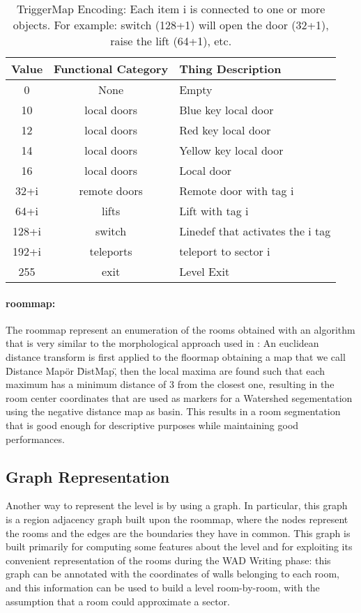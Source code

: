 \begin{table}
\begin{tabularx}{\textwidth}{| c | c | X | }
	\hline
	\textbf{Value} & \textbf{Functional Category} & \textbf{Thing Description} \\
	\hline
	0 &	None &	Empty \\
	10 &	local doors	 & Blue key local door \\
	12 &	local doors & Red key local door \\
	14 &	local doors	 & Yellow key local door \\
	16 &	local doors & Local door \\
	32+i &	remote doors &	Remote door with tag i \\
	64+i &	lifts &	Lift with tag i \\
	128+i &	switch &	Linedef that activates the i tag \\
	192+i &	teleports &	teleport to sector i \\
	255 &	exit &	Level Exit \\
	\hline
\end{tabularx}
\caption[TriggerMap Encoding]{TriggerMap Encoding: Each item i is connected to one or more objects. For example: switch (128+1) will open the door (32+1), raise the lift (64+1), etc.}
\label{tab:triggermap}
\end{table}

\paragraph{\gls{roommap}:} The \gls{roommap} represent an enumeration of the rooms obtained with an algorithm that is very similar to the morphological approach used in \cite{7487234}: An euclidean distance transform \cite{edt} is first applied to the \gls{floormap} obtaining a map that we call \"Distance Map\" or \"DistMap\", then the local maxima are found \cite{localmax} such that each maximum has a minimum distance of 3 from the closest one, resulting in the room center coordinates that are used as markers for a Watershed segementation \cite{watershed} using the negative distance map as basin. This results in a room segmentation that is good enough for descriptive purposes while maintaining good performances.

\subsection{Graph Representation}
Another way to represent the level is by using a graph. In particular, this graph is a region adjacency graph \cite{Trémeau00regionsadjacency} built upon the \gls{roommap}, where the nodes represent the rooms and the edges are the boundaries they have in common. This graph is built primarily for computing some features about the level and for exploiting its convenient representation of the rooms during the WAD Writing phase: this graph can be annotated with the coordinates of walls belonging to each room, and this information can be used to build a level room-by-room, with the assumption that a room could approximate a sector.



